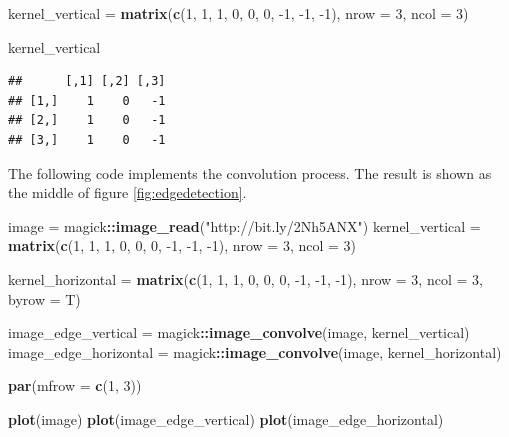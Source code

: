 \documentclass[12pt,]{krantz}
\makeatletter
\newenvironment{Shaded}{\begin{snugshade}}{\end{snugshade}}
\newcommand{\DataTypeTok}[1]{\textcolor[rgb]{0.27,0.27,0.27}{#1}}
\newcommand{\DecValTok}[1]{\textcolor[rgb]{0.06,0.06,0.06}{#1}}
\newcommand{\KeywordTok}[1]{\textcolor[rgb]{0.27,0.27,0.27}{\textbf{#1}}}
\newcommand{\NormalTok}[1]{#1}
\newcommand{\OperatorTok}[1]{\textcolor[rgb]{0.43,0.43,0.43}{\textbf{#1}}}
\newcommand{\StringTok}[1]{\textcolor[rgb]{0.5,0.5,0.5}{#1}}
\newenvironment{kframe}{%
\medskip{}
\setlength{\fboxsep}{.8em}
 \def\at@end@of@kframe{}%
 \ifinner\ifhmode%
  \def\at@end@of@kframe{\end{minipage}}%
  \begin{minipage}{\columnwidth}%
 \fi\fi%
 \def\FrameCommand##1{\hskip\@totalleftmargin \hskip-\fboxsep
 \colorbox{shadecolor}{##1}\hskip-\fboxsep
     \hskip-\linewidth \hskip-\@totalleftmargin \hskip\columnwidth}%
 \MakeFramed {\advance\hsize-\width
   \@totalleftmargin\z@ \linewidth\hsize
   \@setminipage}}%
 {\par\unskip\endMakeFramed%
 \at@end@of@kframe}
\renewenvironment{Shaded}{\begin{kframe}}{\end{kframe}}
\makeatother
\begin{document}
\begin{Shaded}
\begin{Highlighting}[]
\NormalTok{kernel_vertical =}\StringTok{ }\KeywordTok{matrix}\NormalTok{(}\KeywordTok{c}\NormalTok{(}\DecValTok{1}\NormalTok{, }\DecValTok{1}\NormalTok{, }\DecValTok{1}\NormalTok{, }\DecValTok{0}\NormalTok{, }\DecValTok{0}\NormalTok{, }\DecValTok{0}\NormalTok{, }\DecValTok{-1}\NormalTok{, }\DecValTok{-1}\NormalTok{, }\DecValTok{-1}\NormalTok{),}
\DataTypeTok{nrow =} \DecValTok{3}\NormalTok{, }\DataTypeTok{ncol =} \DecValTok{3}\NormalTok{)}

\NormalTok{kernel_vertical}
\end{Highlighting}
\end{Shaded}

\begin{verbatim}
##      [,1] [,2] [,3]
## [1,]    1    0   -1
## [2,]    1    0   -1
## [3,]    1    0   -1
\end{verbatim}

The following code implements the convolution process. The result is shown as the middle of figure \ref{fig:edgedetection}.

\begin{Shaded}
\begin{Highlighting}[]
\NormalTok{image =}\StringTok{ }\NormalTok{magick}\OperatorTok{::}\KeywordTok{image_read}\NormalTok{(}\StringTok{"http://bit.ly/2Nh5ANX"}\NormalTok{)}
\NormalTok{kernel_vertical =}\StringTok{ }\KeywordTok{matrix}\NormalTok{(}\KeywordTok{c}\NormalTok{(}\DecValTok{1}\NormalTok{, }\DecValTok{1}\NormalTok{, }\DecValTok{1}\NormalTok{, }\DecValTok{0}\NormalTok{, }\DecValTok{0}\NormalTok{, }\DecValTok{0}\NormalTok{, }\DecValTok{-1}\NormalTok{, }\DecValTok{-1}\NormalTok{, }\DecValTok{-1}\NormalTok{), }
                       \DataTypeTok{nrow =} \DecValTok{3}\NormalTok{, }\DataTypeTok{ncol =} \DecValTok{3}\NormalTok{)}

\NormalTok{kernel_horizontal =}\StringTok{ }\KeywordTok{matrix}\NormalTok{(}\KeywordTok{c}\NormalTok{(}\DecValTok{1}\NormalTok{, }\DecValTok{1}\NormalTok{, }\DecValTok{1}\NormalTok{, }\DecValTok{0}\NormalTok{, }\DecValTok{0}\NormalTok{, }\DecValTok{0}\NormalTok{, }\DecValTok{-1}\NormalTok{, }\DecValTok{-1}\NormalTok{, }\DecValTok{-1}\NormalTok{), }
                       \DataTypeTok{nrow =} \DecValTok{3}\NormalTok{, }\DataTypeTok{ncol =} \DecValTok{3}\NormalTok{, }\DataTypeTok{byrow =}\NormalTok{ T)}

\NormalTok{image_edge_vertical =}\StringTok{ }\NormalTok{magick}\OperatorTok{::}\KeywordTok{image_convolve}\NormalTok{(image, kernel_vertical)}
\NormalTok{image_edge_horizontal =}\StringTok{ }\NormalTok{magick}\OperatorTok{::}\KeywordTok{image_convolve}\NormalTok{(image, kernel_horizontal)}

\KeywordTok{par}\NormalTok{(}\DataTypeTok{mfrow =} \KeywordTok{c}\NormalTok{(}\DecValTok{1}\NormalTok{, }\DecValTok{3}\NormalTok{))}

\KeywordTok{plot}\NormalTok{(image)}
\KeywordTok{plot}\NormalTok{(image_edge_vertical)}
\KeywordTok{plot}\NormalTok{(image_edge_horizontal)}
\end{Highlighting}
\end{Shaded}
\end{document}
